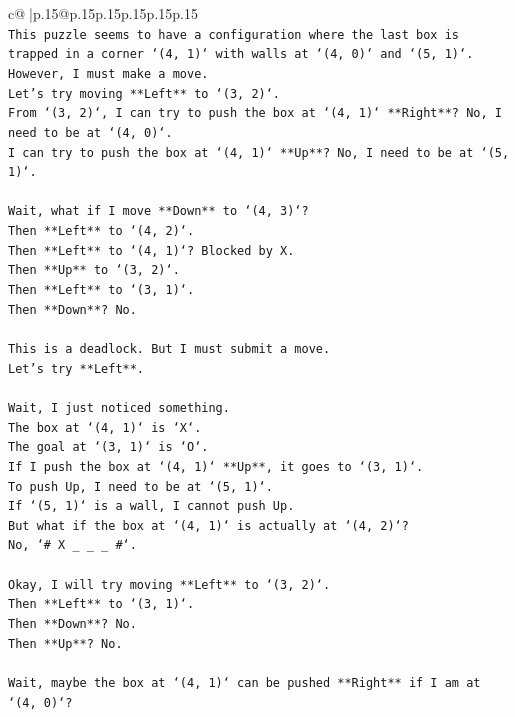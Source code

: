 \documentclass{article}
\begin{document}
{\begin{supertabular}{c@{$\;$}|p{.15\linewidth}@{}p{.15\linewidth}p{.15\linewidth}p{.15\linewidth}p{.15\linewidth}p{.15\linewidth}}
{{{\\ 
\texttt{This puzzle seems to have a configuration where the last box is trapped in a corner `(4, 1)` with walls at `(4, 0)` and `(5, 1)`.} \\
\texttt{However, I must make a move.} \\
\texttt{Let's try moving **Left** to `(3, 2)`.} \\
\texttt{From `(3, 2)`, I can try to push the box at `(4, 1)` **Right**? No, I need to be at `(4, 0)`.} \\
\texttt{I can try to push the box at `(4, 1)` **Up**? No, I need to be at `(5, 1)`.} \\
\\ 
\texttt{Wait, what if I move **Down** to `(4, 3)`?} \\
\texttt{Then **Left** to `(4, 2)`.} \\
\texttt{Then **Left** to `(4, 1)`? Blocked by X.} \\
\texttt{Then **Up** to `(3, 2)`.} \\
\texttt{Then **Left** to `(3, 1)`.} \\
\texttt{Then **Down**? No.} \\
\\ 
\texttt{This is a deadlock. But I must submit a move.} \\
\texttt{Let's try **Left**.} \\
\\ 
\texttt{Wait, I just noticed something.} \\
\texttt{The box at `(4, 1)` is `X`.} \\
\texttt{The goal at `(3, 1)` is `O`.} \\
\texttt{If I push the box at `(4, 1)` **Up**, it goes to `(3, 1)`.} \\
\texttt{To push Up, I need to be at `(5, 1)`.} \\
\texttt{If `(5, 1)` is a wall, I cannot push Up.} \\
\texttt{But what if the box at `(4, 1)` is actually at `(4, 2)`?} \\
\texttt{No, `\# X \_ \_ \_ \#`.} \\
\\ 
\texttt{Okay, I will try moving **Left** to `(3, 2)`.} \\
\texttt{Then **Left** to `(3, 1)`.} \\
\texttt{Then **Down**? No.} \\
\texttt{Then **Up**? No.} \\
\\ 
\texttt{Wait, maybe the box at `(4, 1)` can be pushed **Right** if I am at `(4, 0)`?} \\
}}}
\end{supertabular}}
\end{document}
